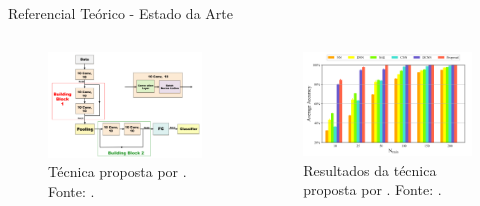 \documentclass[aspectratio=169]{beamer}
\begin{document}

\begin{frame}{Referencial Teórico - Estado da Arte}
	\begin{columns}
    	\begin{column}{0.50\textwidth}
			\begin{figure}[HT]
				\begin{center}
					\includegraphics[scale=.27]{../referencial/img/proposta_zhang_p4.png}
					\caption{Técnica proposta por . \newline
					Fonte: .} 
					\label{fig:cnn_ince_p2}
				\end{center}
			\end{figure}
     	\end{column}
		
		\begin{column}{0.5\textwidth}
			\begin{figure}[HT]
				\begin{center}
					\includegraphics[scale=.25]{../referencial/img/results_zhang_p7.png}
					\caption{Resultados da técnica proposta \newline
					por . \newline
					Fonte: .} 
					\label{fig:orbit_jeong_p3}
				\end{center}
			\end{figure}	
	 	\end{column}
	 \end{columns}
\end{frame}
\end{document}
